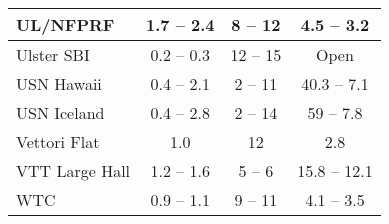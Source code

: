 \begin{table}[p]
\begin{center}
\begin{tabular}{|l|c|c|c|}
UL/NFPRF            & 1.7 -- 2.4    & 8 -- 12       & 4.5 -- 3.2    \\ \hline
Ulster SBI          & 0.2 -- 0.3    & 12 -- 15      & Open          \\ \hline
USN Hawaii          & 0.4 -- 2.1    & 2 -- 11       & 40.3 -- 7.1   \\ \hline
USN Iceland         & 0.4 -- 2.8    & 2 -- 14       & 59 -- 7.8     \\ \hline
Vettori Flat        & 1.0           & 12            & 2.8           \\ \hline
VTT Large Hall      & 1.2 -- 1.6    & 5 -- 6        & 15.8 -- 12.1  \\ \hline
WTC                 & 0.9 -- 1.1    & 9 -- 11       & 4.1 -- 3.5    \\ \hline
\end{tabular}
\end{center}
\label{Numerical_Parameters}
\nopagebreak
\end{table}






